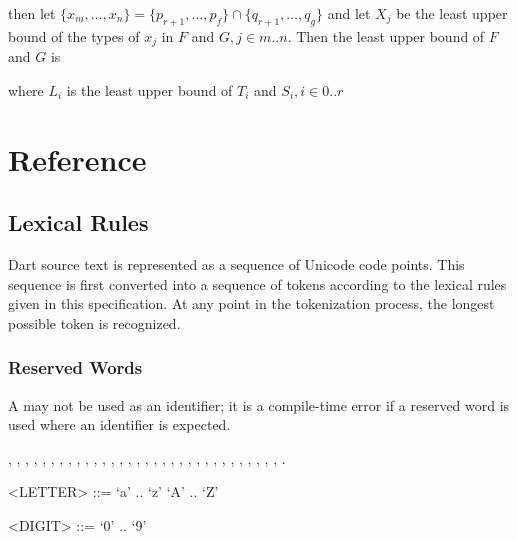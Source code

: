 \documentclass[makeidx]{article}
\begin{document}
{\begin{itemize}
then let
$\{x_m, \ldots, x_n\} = \{p_{r+1}, \ldots, p_f\} \cap \{q_{r+1}, \ldots, q_g\}$
and let $X_j$ be the least upper bound of the types of $x_j$ in $F$ and
$G, j \in m .. n$.
Then the least upper bound of $F$ and $G$ is


where $L_i$ is the least upper bound of $T_i$ and $S_i, i \in 0 .. r$
\end{itemize}



\section{Reference}


\subsection{Lexical Rules}

\LMHash{}%
Dart source text is represented as a sequence of Unicode code points.
This sequence is first converted into a sequence of tokens according to the lexical rules given in this specification.
At any point in the tokenization process, the longest possible token is recognized.


\subsubsection{Reserved Words}

\LMHash{}%
A  may not be used as an identifier; it is a compile-time error if a reserved word is used where an identifier is expected.

\ASSERT{}, \BREAK{}, \CASE{}, \CATCH{}, \CLASS{}, \CONST{}, \CONTINUE{}, \DEFAULT{}, \DO{}, \ELSE{}, \ENUM{}, \EXTENDS{}, \FALSE{}, \FINAL{}, \FINALLY{}, \FOR{}, \IF{}, \IN{}, \IS{}, \NEW{}, \NULL{}, \RETHROW, \RETURN{}, \SUPER{}, \SWITCH{}, \THIS{}, \THROW{}, \TRUE{}, \TRY{}, \VAR{}, \VOID{}, \WHILE{}, \WITH{}.

\begin{grammar}
<LETTER> ::= `a' .. `z'
  \alt `A' .. `Z'

<DIGIT> ::= `0' .. `9'


\end{grammar}}
\end{document}
